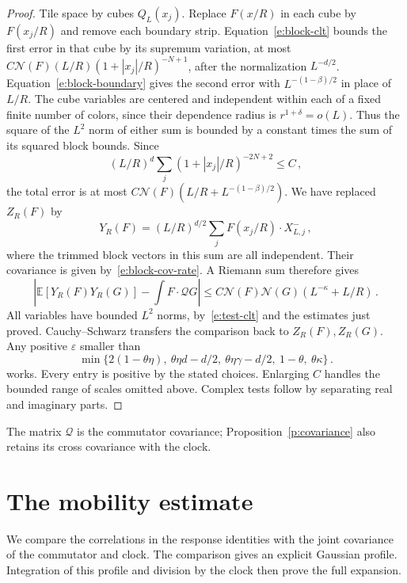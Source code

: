 \documentclass[11pt]{amsart}
\theoremstyle{definition}
\theoremstyle{remark}
\numberwithin{equation}{section}
\newcommand{\E}{\mathbb E}
\newcommand{\abs}[1]{\left|#1\right|}
\begin{document}
\begin{proof}
Tile space by cubes $Q_L(x_j)$. Replace $F(x/R)$ in each cube by $F(x_j/R)$ and remove each boundary strip. Equation~\eqref{e:block-clt} bounds the first error in that cube by its supremum variation, at most $C\mathcal N(F)(L/R)(1+|x_j|/R)^{-N+1}$, after the normalization $L^{-d/2}$. Equation~\eqref{e:block-boundary} gives the second error with $L^{-(1-\beta)/2}$ in place of $L/R$. The cube variables are centered and independent within each of a fixed finite number of colors, since their dependence radius is $r^{1+\delta}=o(L)$. Thus the square of the $L^2$ norm of either sum is bounded by a constant times the sum of its squared block bounds. Since
\begin{equation*}
 (L/R)^d\sum_j(1+|x_j|/R)^{-2N+2}\leq C\, ,
\end{equation*}
the total error is at most $C\mathcal N(F)(L/R+L^{-(1-\beta)/2})$. We have replaced $Z_R(F)$ by
\begin{equation*}
 Y_R(F)=(L/R)^{d/2}\sum_jF(x_j/R)\cdot X_{L,j}^-\, ,
\end{equation*}
where the trimmed block vectors in this sum are all independent. Their covariance is given by~\eqref{e:block-cov-rate}. A Riemann sum therefore gives
\begin{equation*}
 \abs{\E[Y_R(F)Y_R(G)]-\int F\cdot\mathcal QG}
 \leq C\mathcal N(F)\mathcal N(G)(L^{-\kappa}+L/R)\, .
\end{equation*}
All variables have bounded $L^2$ norms, by~\eqref{e:test-clt} and the estimates just proved. Cauchy--Schwarz transfers the comparison back to $Z_R(F),Z_R(G)$. Any positive $\varepsilon$ smaller than
\begin{equation}\label{e:cov-exponent}
 \min\{2(1-\theta\eta),\ \theta\eta d-d/2,
       \ \theta\eta\gamma-d/2,\ 1-\theta,\ \theta\kappa\}\, .
\end{equation}
works. Every entry is positive by the stated choices. Enlarging $C$ handles the bounded range of scales omitted above. Complex tests follow by separating real and imaginary parts.
\end{proof}

The matrix $\mathscr Q$ is the commutator covariance; Proposition~\ref{p:covariance} also retains its cross covariance with the clock.


\section{The mobility estimate}\label{sec.rate}

We compare the correlations in the response identities with the joint covariance of the commutator and clock. The comparison gives an explicit Gaussian profile. Integration of this profile and division by the clock then prove the full expansion.
\end{document}
